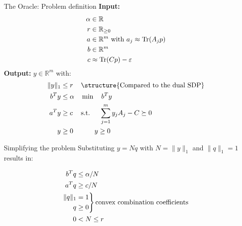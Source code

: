 \begin{frame}{The Oracle: Problem definition}
\textbf{Input: }
\begin{align*}
\alpha&\in\mathbb{R}\\
r&\in \mathbb{R}_{\geq 0}\\
a&\in \mathbb{R}^m \text{ with } a_j\approx \operatorname{Tr}(A_j p)\\
b&\in \mathbb{R}^m\\
c&\approx \operatorname{Tr}(Cp)-\varepsilon
\end{align*}
\textbf{Output: } $y\in \mathbb{R}^m$ with:
\begin{align*}
\|y\|_1&\leq r && \text{\structure{Compared to the dual SDP}}\\
b^T y&\leq \alpha&&\min \quad b^T y\\
a^T y&\geq c&&\text{s.t. } \quad \sum_{j=1}^m y_j A_j - C\succeq 0\\
y&\geq 0 && \qquad y\geq 0
\end{align*}

\end{frame}

\begin{frame}{Simplifying the problem}
Substituting $y=Nq$ with $N=\|y\|_1$ and $\|q\|_1=1$ results in:

\begin{equation*}
 \begin{split}
  b^T q&\leq \alpha/N\\
  a^T q&\geq c/N\\
  \begin{aligned}
   \|q\|_1\\
   q
  \end{aligned}
  &
  \begin{rcases*}
   =1\\
   \geq 0
  \end{rcases*} \text{convex combination coefficients}  \\
  0&<N\leq r
 \end{split}
\end{equation*}
\end{frame}

